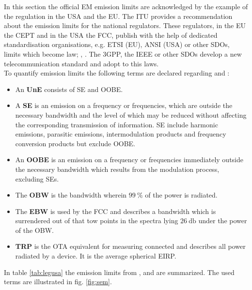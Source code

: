 In this section the official \ac{EM} emission limits are acknowledged by the example of the regulation in the \ac{USA} and the \ac{EU}. The \ac{ITU} provides a recommendation \cite{seitur} about the emission limits for the national regulators. These regulators, in the \ac{EU} the \ac{CEPT} and in the \ac{USA} the \ac{FCC}, publish with the help of dedicated standardisation organisations, e.g. \ac{ETSI} (\ac{EU}), \ac{ANSI} (\ac{USA}) or other \acp{SDO}, limits which become law; \cite{ceptercrec}, \cite{ansi}. The \ac{3GPP}, the \ac{IEEE} or other \acp{SDO} develop a new telecommunication standard and adopt to this laws.\\
To quantify emission limits the following terms are declared regarding \cite{seitur} and \cite{ctiaat}:

\begin{itemize}
\item An \textbf{\acf{UnE}} consists of \ac{SE} and \ac{OOBE}.
\item A \textbf{\acf{SE}} is an emission on a frequency or frequencies, which are outside the necessary bandwidth and the level of which may be reduced without affecting the corresponding transmission of information. \acl{SE} include harmonic
emissions, parasitic emissions, intermodulation products and frequency conversion products but exclude \ac{OOBE}.
\item An \textbf{\acf{OOBE}} is an emission on a frequency or frequencies immediately outside the necessary bandwidth which results from the modulation process, excluding \aclp{SE}.
\item The \textbf{\acf{OBW}} is the bandwidth wherein $\SI{99}{\percent}$ of the power is radiated.
\item The \textbf{\acf{EBW}} is used by the \ac{FCC} and describes a bandwidth which is surrendered out of that tow points in the spectra lying $\SI{26}{\decibel}$ under the power of the \ac{OBW}. 
\item \textbf{\acf{TRP}} is the \ac{OTA} equivalent for measuring connected and describes all power radiated by a device. It is the average spherical \ac{EIRP}.
\end{itemize}


In table \ref{tab:legusa} the emission limits from \cite{ceptercrec}, \cite{ansi} and \cite{fcc} are summarized. The used terms are illustrated in fig. \ref{fig:sem}.

